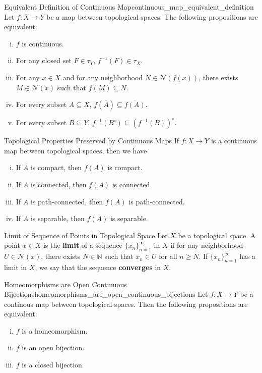 \documentclass{report}
\begin{document}
\begin{proposition}{Equivalent Definition of Continuous Map}{continuous_map_equivalent_definition}
	Let $f:X\to Y$ be a map between topological spaces. The following propositions are equivalent:
	\begin{enumerate}[(i)]
		\item $f$ is continuous.
		\item For any closed set $F\in\tau_Y$, $f^{-1}(F)\in\tau_X$.
		\item For any $x\in X$ and for any neighborhood $N\in\mathcal{N}(f(x))$, there exists $M\in\mathcal{N}(x)$ such that $f(M)\subseteq N$.
		\item For every subset $A\subseteq X$, $f(\overline{A})\subseteq \overline{f(A)}$.
		\item For every subset $B\subseteq Y$, $f^{-1}(B^\circ)\subseteq (f^{-1}(B))^\circ$.
	\end{enumerate}
\end{proposition}

\begin{definition}{Topological Properties Preserved by Continuous Maps}{}
	If $f:X\to Y$ is a continuous map between topological spaces, then we have
	\begin{enumerate}[(i)]
		\item If $A$ is compact, then $f(A)$ is compact.
		\item If $A$ is connected, then $f(A)$ is connected.
		\item If $A$ is path-connected, then $f(A)$ is path-connected.
		\item If $A$ is separable, then $f(A)$ is separable.
	\end{enumerate}
\end{definition}

\begin{definition}{Limit of Sequence of Points in Topological Space}{}
	Let $X$ be a topological space. A point $x\in X$ is the \textbf{limit} of a sequence $\{x_n\}_{n=1}^\infty$ in $X$ if for any neighborhood $U\in\mathcal{N}(x)$, there exists $N\in\mathbb{N}$ such that $x_n\in U$ for all $n\ge N$. If $\{x_n\}_{n=1}^\infty$ has a limit in $X$, we say that the sequence \textbf{converges} in $X$.
\end{definition}






\begin{proposition}{Homeomorphisms are Open Continuous Bijections}{homeomorphisms_are_open_continuous_bijections}
	Let $f:X\to Y$ be a continous map between topological spaces. Then the following propositions are equivalent:
	\begin{enumerate}[(i)]
		\item $f$ is a homeomorphism.
		\item $f$ is an open bijection.
		\item $f$ is a closed bijection.
	\end{enumerate}
\end{proposition}
\end{document}
